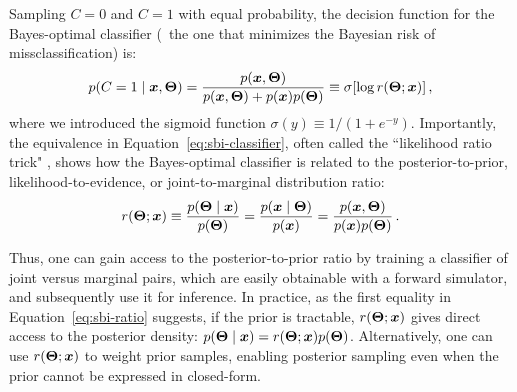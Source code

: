 Sampling $C=0$ and $C=1$ with equal probability, the decision function for the Bayes-optimal classifier  \cite{Devroye:1996aa} (\ie~the one that minimizes the Bayesian risk of missclassification) is:
\begin{equation} \label{eq:sbi-classifier}
    p(C = 1 \mid \bm{x}, \bm{\Theta}) = \frac{p(\bm{x}, \bm{\Theta})}{p(\bm{x}, \bm{\Theta}) + p(\bm{x}) p(\bm{\Theta})} \equiv \sigma[ \log r(\bm{\Theta}; \bm{x})] \, ,
\end{equation}
where we introduced the sigmoid function $\sigma(y) \equiv 1 / (1 + e^{-y})$. Importantly, the equivalence in Equation~\eqref{eq:sbi-classifier}, often called the ``likelihood ratio trick" \cite[\eg][]{cranmer2015approximating, Brehmer:2019jyt}, shows how the Bayes-optimal classifier is related to the  posterior-to-prior, likelihood-to-evidence, or joint-to-marginal distribution ratio:
\begin{equation} \label{eq:sbi-ratio}
    r(\bm{\Theta};\bm{x}) \equiv \frac{p(\bm{\Theta} \mid \bm{x})}{p(\bm{\Theta})} = \frac{p(\bm{x} \mid \bm{\Theta})}{p(\bm{x})} =  \frac{p(\bm{x}, \bm{\Theta})}{p(\bm{x}) p(\bm{\Theta})} \, .
\end{equation}

Thus, one can gain access to the posterior-to-prior ratio by training a classifier of joint versus marginal pairs, which are easily obtainable with a forward simulator, and subsequently use it for inference. In practice, as the first equality in Equation~\eqref{eq:sbi-ratio} suggests, if the prior is tractable, $r(\bm{\Theta};\bm{x})$ gives direct access to the posterior density:  $p(\bm{\Theta} \mid \bm{x})=r(\bm{\Theta};\bm{x})p(\bm{\Theta})$.  Alternatively, one can use $r(\bm{\Theta};\bm{x})$ to weight prior samples, enabling posterior sampling even when the prior cannot be expressed in closed-form.

